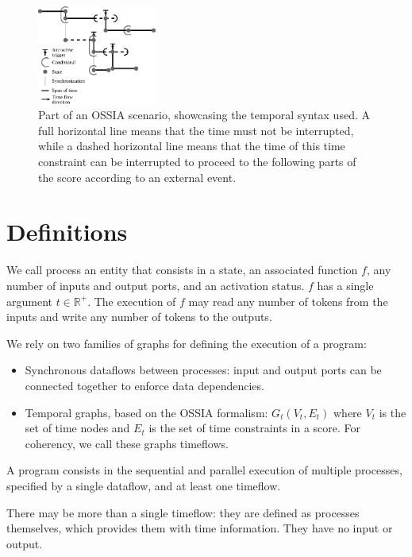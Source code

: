\documentclass{article}
\begin{document}
\begin{figure}[h]
  \centering
  \includegraphics[width=0.35\textwidth]{images/iscore-example.eps}
  \caption{Part of an OSSIA scenario, showcasing the temporal syntax used. 
    A full horizontal line means that the time must not be interrupted, 
    while a dashed horizontal line means that the time of this time constraint can be interrupted to proceed 
  to the following parts of the score according to an external event.}
  \label{fig.iscore-example}
\end{figure}
    
\section{Definitions}
We call process an entity that consists in a state, an associated function $f$, any number of inputs and output ports, and an activation status.
$f$ has a single argument $t \in \mathbb{R^+}$.
The execution of $f$ may read any number of tokens from the inputs and write any number of tokens to the outputs.
    
We rely on two families of graphs for defining the execution of a program:
    
\begin{itemize}
  \item Synchronous dataflows between processes: input and output ports can be connected together to enforce data dependencies.
  \item Temporal graphs, based on the OSSIA formalism: $G_t(V_t, E_t)$ where $V_t$ is the set of time nodes and $E_t$ is the set of time constraints in a score. 
  For coherency, we call these graphs timeflows.
\end{itemize}

A program consists in the sequential and parallel execution of multiple processes, specified by a single dataflow, and at least one timeflow.
    
There may be more than a single timeflow: they are defined as processes themselves, which provides them with time information.
They have no input or output.
    
\end{document}
